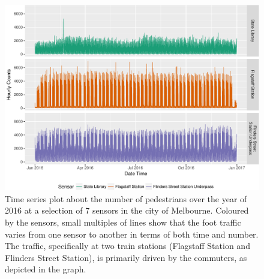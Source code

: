 \documentclass[article]{jss}
\begin{document}
\begin{CodeChunk}
\begin{figure}

{\centering \includegraphics[width=\textwidth]{figure/time-series-plot-1} 

}

\caption[Time series plot about the number of pedestrians over the year of 2016 at a selection of 7 sensors in the city of Melbourne]{Time series plot about the number of pedestrians over the year of 2016 at a selection of 7 sensors in the city of Melbourne. Coloured by the sensors, small multiples of lines show that the foot traffic varies from one sensor to another in terms of both time and number. The traffic, specifically at two train stations (Flagstaff Station and Flinders Street Station), is primarily driven by the commuters, as depicted in the graph.}\label{fig:time-series-plot}
\end{figure}
\end{CodeChunk}
\end{document}
